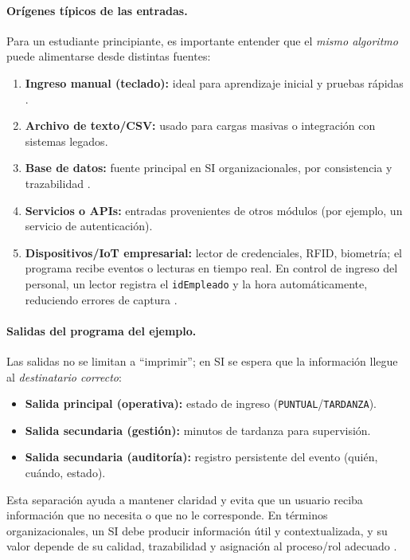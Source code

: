 \documentclass[12pt,twoside]{book}
\begin{document}
						\paragraph{Orígenes típicos de las entradas.}
						Para un estudiante principiante, es importante entender que el \emph{mismo algoritmo} puede alimentarse desde distintas fuentes:
						\begin{enumerate}
							\item \textbf{Ingreso manual (teclado):} ideal para aprendizaje inicial y pruebas rápidas \cite{Gaddis2022Starting,Farrell2018Programming}.
							\item \textbf{Archivo de texto/CSV:} usado para cargas masivas o integración con sistemas legados.
							\item \textbf{Base de datos:} fuente principal en SI organizacionales, por consistencia y trazabilidad \cite{Elmasri2016Database,Silberschatz2020Database}.
							\item \textbf{Servicios o APIs:} entradas provenientes de otros módulos (por ejemplo, un servicio de autenticación).
							\item \textbf{Dispositivos/IoT empresarial:} lector de credenciales, RFID, biometría; el programa recibe eventos o lecturas en tiempo real. En control de ingreso del personal, un lector registra el \texttt{idEmpleado} y la hora automáticamente, reduciendo errores de captura \cite{Atieh2025Impact,Varzaru2024Digital,Verhoef2021Digital}.
						\end{enumerate}
						
						\paragraph{Salidas del programa del ejemplo.}
						Las salidas no se limitan a ``imprimir''; en SI se espera que la información llegue al \emph{destinatario correcto}:
						
						\begin{itemize}
							\item \textbf{Salida principal (operativa):} estado de ingreso (\texttt{PUNTUAL}/\texttt{TARDANZA}).
							\item \textbf{Salida secundaria (gestión):} minutos de tardanza para supervisión.
							\item \textbf{Salida secundaria (auditoría):} registro persistente del evento (quién, cuándo, estado).
						\end{itemize}
						
						\noindent
						Esta separación ayuda a mantener claridad y evita que un usuario reciba información que no necesita o que no le corresponde. En términos organizacionales, un SI debe producir información útil y contextualizada, y su valor depende de su calidad, trazabilidad y asignación al proceso/rol adecuado \cite{Laudon2020Management,Kendall2014Systems,Bernstein2009Data}.
						
\end{document}
